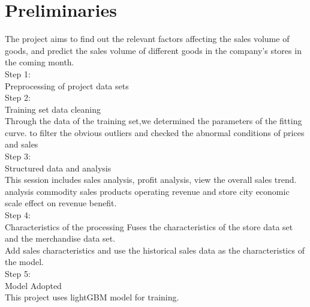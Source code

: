 \section{Preliminaries} \label{sec-preliminaries}
The project aims to find out the relevant factors affecting the sales volume of goods, 
and predict the sales volume of different goods in the company's stores in the coming month.\\
Step 1:\\
Preprocessing of project data sets\\
Step 2:\\
Training set data cleaning\\
Through the data of the training set,we determined the parameters of the fitting curve. 
to filter the obvious outliers and checked the abnormal conditions of prices and sales\\ 
Step 3:\\
Structured data and analysis \\
This session includes sales analysis, profit analysis, view the overall sales trend.\\
analysis commodity sales products operating revenue and store city economic scale effect on revenue benefit.\\
Step 4:\\
Characteristics of the processing
Fuses the characteristics of the store data set and the merchandise data set.\\
Add sales characteristics and use the historical sales data as the characteristics of the model.\\
Step 5:\\
Model Adopted\\
This project uses lightGBM model for training.

 


